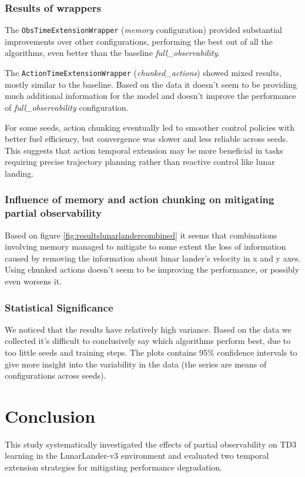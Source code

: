 \documentclass[12pt, a4paper]{article}
\begin{document}
\subsubsection{Results of wrappers}

The \texttt{ObsTimeExtensionWrapper} (\textit{memory} configuration) provided substantial improvements over other configurations, performing the best out of all the algorithms, even better than the baseline \textit{full\_observability}. 

The \texttt{ActionTimeExtensionWrapper} (\textit{chunked\_actions}) showed mixed results, mostly similar to the baseline. Based on the data it doesn't seem to be providing much additional information for the model and doesn't improve the performance of \textit{full\_observability} configuration. 

For some seeds, action chunking eventually led to smoother control policies with better fuel efficiency, but convergence was slower and less reliable across seeds. This suggests that action temporal extension may be more beneficial in tasks requiring precise trajectory planning rather than reactive control like lunar landing.

\subsubsection{Influence of memory and action chunking on mitigating partial observability}
Based on figure \ref{fig:resultslunarlandercombined} it seems that combinations involving memory managed to mitigate to some extent the loss of information caused by removing the information about lunar lander's velocity in x and y axes. Using chunked actions doesn't seem to be improving the performance, or possibly even worsens it.


\subsubsection{Statistical Significance}
We noticed that the results have relatively high variance. Based on the data we collected it's difficult to conclusively say which algorithms perform best, due to too little seeds and training steps. The plots contains 95\% confidence intervals to give more insight into the variability in the data (the series are means  of configurations across seeds).

\section{Conclusion}

This study systematically investigated the effects of partial observability on TD3 learning in the LunarLander-v3 environment and evaluated two temporal extension strategies for mitigating performance degradation.
\end{document}
